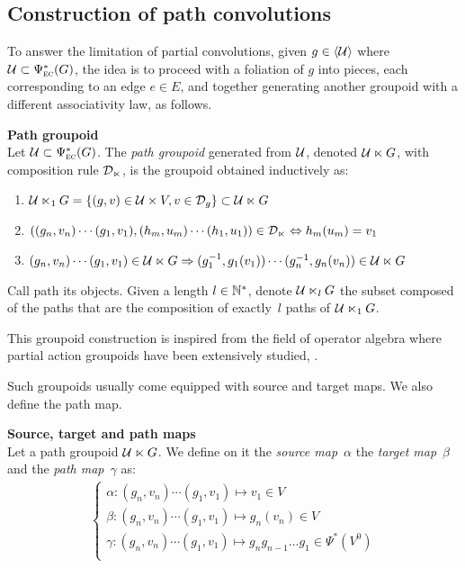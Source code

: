 \subsection{Construction of path convolutions}

To answer the limitation of partial convolutions, given $g \in \langle \mathcal{U} \rangle$ where $\mathcal{U} \subset \Psi_{\operatorname{\textsc{ec}}}^*(G)$, the idea is to proceed with a foliation of $g$ into pieces, each corresponding to an edge $e \in E$, and together generating another groupoid with a different associativity law, as follows.

\begin{definition}\textbf{Path groupoid}\\
Let $\mathcal{U} \subset \Psi_{\operatorname{\textsc{ec}}}^*(G)$. The \emph{path groupoid} generated from $\mathcal{U}$, denoted $\mathcal{U} \ltimes G$, with composition rule $\mathcal{D}_{\ltimes}$, is the groupoid obtained inductively as:
\begin{enumerate}
  \item $\mathcal{U} \ltimes_1 G = \{(g,v) \in \mathcal{U} \times V, v \in \mathcal{D}_g \} \subset \mathcal{U} \ltimes G$
  \item $((g_n,v_n) \cdots (g_1,v_1) , (h_m,u_m) \cdots (h_1,u_1)) \in \mathcal{D}_{\ltimes} \Leftrightarrow h_m(u_m) = v_1$
  \item $(g_n,v_n) \cdots (g_1,v_1) \in \mathcal{U} \ltimes G \Rightarrow (g_1^{-1}, g_1(v_1)) \cdots (g_n^{-1}, g_n(v_n)) \in \mathcal{U} \ltimes G$
\end{enumerate}
Call path its objects. Given a length $l \in \mathbb{N}^*$, denote $\mathcal{U} \ltimes_l G$ the subset composed of the paths that are the composition of exactly~$l$ paths of $\mathcal{U} \ltimes_1 G$.
\end{definition}

\begin{remark}
This groupoid construction is inspired from the field of operator algebra where partial action groupoids have been extensively studied, \eg \cite{nica1994groupoid,exel1998partial,li2016partial}.
\end{remark}

Such groupoids usually come equipped with source and target maps. We also define the path map.

\begin{definition}\textbf{Source, target and path maps}\\
Let a path groupoid $\mathcal{U} \ltimes G$. We define on it the \emph{source map}~$\alpha$ the \emph{target map}~$\beta$ and the \emph{path map}~$\gamma$ as:
\begin{gather*}
\begin{cases}
  \alpha: (g_n,v_n) \cdots (g_1,v_1) \mapsto v_1 \in V\\
  \beta: (g_n,v_n) \cdots (g_1,v_1) \mapsto g_n(v_n) \in V\\
  \gamma: (g_n,v_n) \cdots (g_1,v_1) \mapsto g_ng_{n-1}\ldots g_1 \in \Psi^*(V^0)\\
\end{cases}
\end{gather*}
\end{definition}

